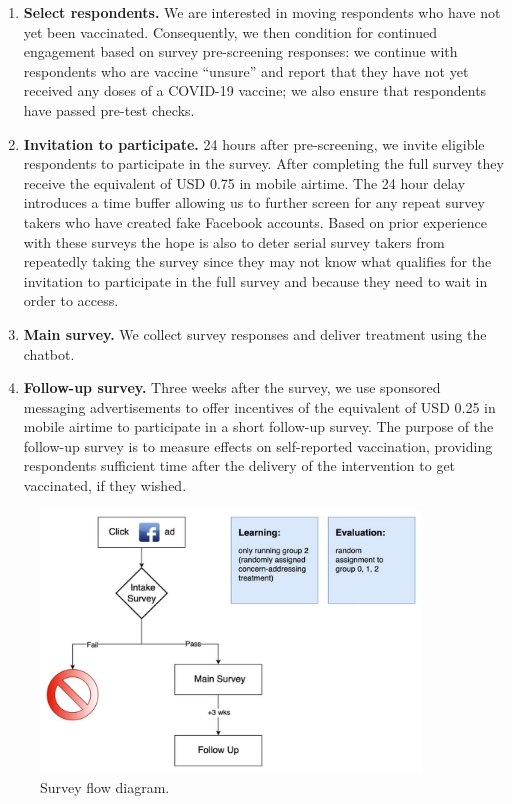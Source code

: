 \documentclass[letterpaper, 12pt, parskip=full,DIV=10]{scrartcl}
\begin{document}
\begin{enumerate}
\item \textbf{Select respondents.} We are interested in moving respondents who have not yet been vaccinated. Consequently, we then condition for continued engagement based on survey pre-screening responses: we continue with respondents who are vaccine ``unsure'' and report that they have not yet received any doses of a COVID-19 vaccine; we also ensure that respondents have passed pre-test checks. 

\item \textbf{Invitation to participate.} 24 hours after pre-screening, we invite eligible respondents to participate in the survey. After completing the full survey they receive the equivalent of USD 0.75 in mobile airtime. The 24 hour delay introduces a time buffer allowing us to further screen for any repeat survey takers who have created fake Facebook accounts. Based on prior experience with these surveys the hope is also to deter serial survey takers from repeatedly taking the survey since they may not know what qualifies for the invitation to participate in the full survey and because they need to wait in order to access. 

\item \textbf{Main survey.} We collect survey responses and deliver treatment using the chatbot. 

\item \textbf{Follow-up survey.} Three weeks after the survey, we use sponsored messaging advertisements to offer incentives of the equivalent of USD 0.25 in mobile airtime to participate in a short follow-up survey. The purpose of the follow-up survey is to measure effects on self-reported vaccination, providing respondents sufficient time after the delivery of the intervention to get vaccinated, if they wished.

\end{enumerate}

\begin{figure}[h!]
   \centering
   \includegraphics[width = 0.9\textwidth]{../../tables-figures/vcf_survey_flow.jpg} 
   \caption{Survey flow diagram.}
   \label{fig:surveyflow}
\end{figure}
\end{document}

